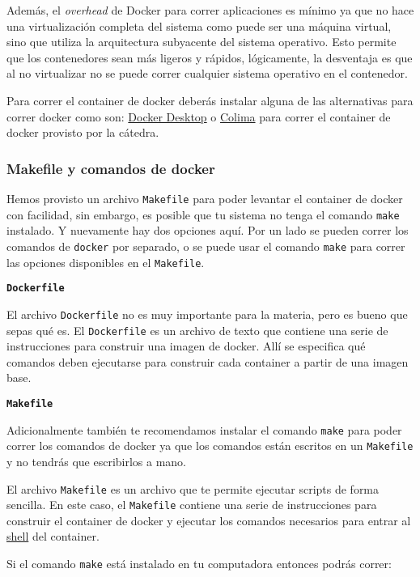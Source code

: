 Además, el \textit{overhead} de Docker para correr aplicaciones es mínimo ya que no hace una virtualización completa del
sistema como puede ser una máquina virtual, sino que utiliza la arquitectura subyacente del sistema operativo. Esto
permite que los contenedores sean más ligeros y rápidos, lógicamente, la desventaja es que al no virtualizar no se puede
correr cualquier sistema operativo en el contenedor.

Para correr el container de docker deberás instalar alguna de las alternativas para correr docker como son:
\href{https://www.docker.com/products/docker-desktop/}{Docker Desktop} o
\href{https://github.com/abiosoft/colima}{Colima} para correr el container de docker provisto por la cátedra.

\subsubsection{Makefile y comandos de docker}

Hemos provisto un archivo \texttt{Makefile} para poder levantar el container de docker con facilidad, sin embargo, es
posible que tu sistema no tenga el comando \texttt{make} instalado. Y nuevamente hay dos opciones aquí. Por un lado se
pueden correr los comandos de \texttt{docker} por separado, o se puede usar el comando \texttt{make} para correr las
opciones disponibles en el \texttt{Makefile}.

\textbf{\texttt{Dockerfile}}

El archivo \texttt{Dockerfile} no es muy importante para la materia, pero es bueno que sepas qué es. El
\texttt{Dockerfile} es un archivo de texto que contiene una serie de instrucciones para construir una imagen de
docker. Allí se especifica qué comandos deben ejecutarse para construir cada container a partir de una imagen base.

\textbf{\texttt{Makefile}}

Adicionalmente también te recomendamos instalar el comando \texttt{make} para poder correr los comandos de docker ya que
los comandos están escritos en un \texttt{Makefile} y no tendrás que escribirlos a mano.

El archivo \texttt{Makefile} es un archivo que te permite ejecutar scripts de forma sencilla. En este caso, el
\texttt{Makefile} contiene una serie de instrucciones para construir el container de docker y ejecutar los comandos
necesarios para entrar al \href{https://linuxcommand.org/lc3_lts0010.php}{shell} del container.

Si el comando \texttt{make} está instalado en tu computadora entonces podrás correr:

